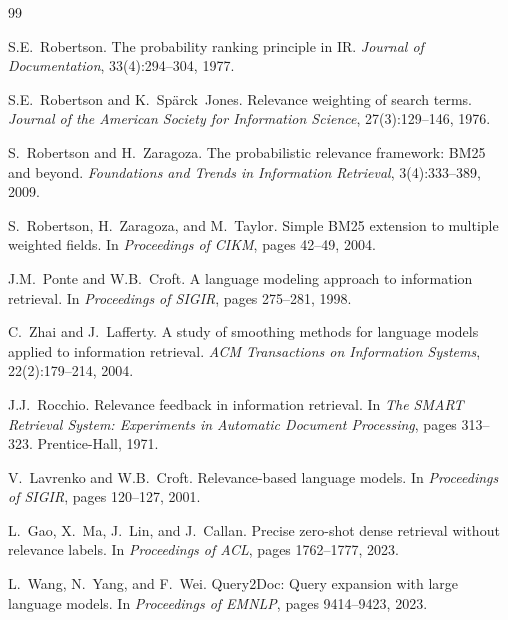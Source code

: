 \documentclass[11pt,a4paper]{article}
\theoremstyle{definition}
\theoremstyle{plain}
\begin{document}
\begin{thebibliography}{99}

S.E.~Robertson.
\newblock The probability ranking principle in {IR}.
\newblock \emph{Journal of Documentation}, 33(4):294--304, 1977.

S.E.~Robertson and K.~Sp\"arck~Jones.
\newblock Relevance weighting of search terms.
\newblock \emph{Journal of the American Society for Information Science}, 27(3):129--146, 1976.

S.~Robertson and H.~Zaragoza.
\newblock The probabilistic relevance framework: {BM25} and beyond.
\newblock \emph{Foundations and Trends in Information Retrieval}, 3(4):333--389, 2009.

S.~Robertson, H.~Zaragoza, and M.~Taylor.
\newblock Simple {BM25} extension to multiple weighted fields.
\newblock In \emph{Proceedings of CIKM}, pages 42--49, 2004.

J.M.~Ponte and W.B.~Croft.
\newblock A language modeling approach to information retrieval.
\newblock In \emph{Proceedings of SIGIR}, pages 275--281, 1998.

C.~Zhai and J.~Lafferty.
\newblock A study of smoothing methods for language models applied to information retrieval.
\newblock \emph{ACM Transactions on Information Systems}, 22(2):179--214, 2004.

J.J.~Rocchio.
\newblock Relevance feedback in information retrieval.
\newblock In \emph{The SMART Retrieval System: Experiments in Automatic Document Processing}, pages 313--323. Prentice-Hall, 1971.

V.~Lavrenko and W.B.~Croft.
\newblock Relevance-based language models.
\newblock In \emph{Proceedings of SIGIR}, pages 120--127, 2001.

L.~Gao, X.~Ma, J.~Lin, and J.~Callan.
\newblock Precise zero-shot dense retrieval without relevance labels.
\newblock In \emph{Proceedings of ACL}, pages 1762--1777, 2023.

L.~Wang, N.~Yang, and F.~Wei.
\newblock Query2Doc: Query expansion with large language models.
\newblock In \emph{Proceedings of EMNLP}, pages 9414--9423, 2023.


\end{thebibliography}
\end{document}
